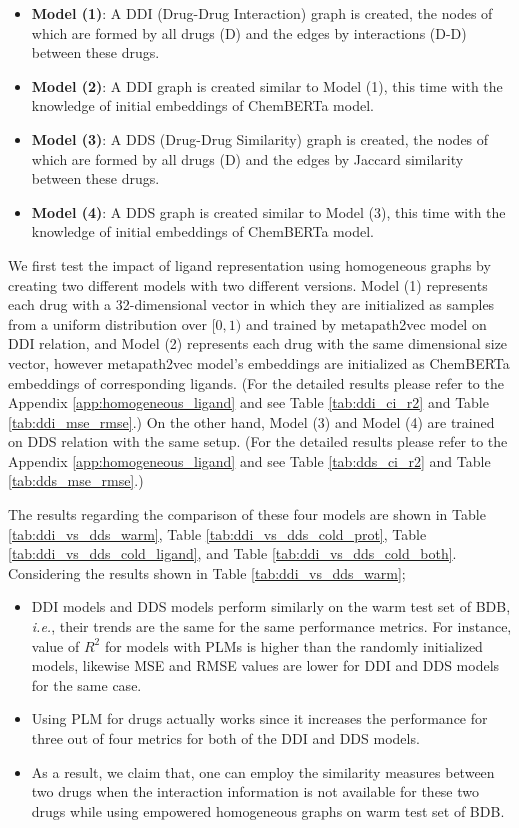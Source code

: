 \begin{itemize}
    \item \textbf{Model (1)}: A DDI (Drug-Drug Interaction) graph is created, the nodes of which are formed by all drugs (D) and the edges by interactions (D-D) between these drugs.   
    \item \textbf{Model (2)}: A DDI graph is created similar to Model (1), this time with the knowledge of initial embeddings of ChemBERTa model.
    \item \textbf{Model (3)}: A DDS (Drug-Drug Similarity) graph is created, the nodes of which are formed by all drugs (D) and the edges by Jaccard similarity between these drugs. 
    \item \textbf{Model (4)}: A DDS graph is created similar to Model (3), this time with the knowledge of initial embeddings of ChemBERTa model.
\end{itemize}

We first test the impact of ligand representation using homogeneous graphs by creating two different models with two different versions. Model (1) represents each drug with a 32-dimensional vector in which they are initialized as samples
from a uniform distribution over $[0, 1)$ and trained by metapath2vec model on DDI relation, and Model (2) represents each drug with the same dimensional size vector, however metapath2vec model's embeddings are initialized as ChemBERTa embeddings of corresponding ligands. (For the detailed results please refer to the Appendix \ref{app:homogeneous_ligand} and see Table \ref{tab:ddi_ci_r2} and Table \ref{tab:ddi_mse_rmse}.) On the other hand, Model (3) and Model (4) are trained on DDS relation with the same setup. (For the detailed results please refer to the Appendix \ref{app:homogeneous_ligand} and see Table \ref{tab:dds_ci_r2} and Table \ref{tab:dds_mse_rmse}.)

The results regarding the comparison of these four models are shown in Table \ref{tab:ddi_vs_dds_warm}, Table \ref{tab:ddi_vs_dds_cold_prot}, Table \ref{tab:ddi_vs_dds_cold_ligand}, and Table \ref{tab:ddi_vs_dds_cold_both}. Considering the results shown in Table \ref{tab:ddi_vs_dds_warm};
\begin{itemize}
    \item DDI models and DDS models perform similarly on the warm test set of BDB, \textit{i.e.}, their trends are the same for the same performance metrics. For instance, value of $R^2$ for models with PLMs is higher than the randomly initialized models, likewise MSE and RMSE values are lower for DDI and DDS models for the same case.
    \item Using PLM for drugs actually works since it increases the performance for three out of four metrics for both of the DDI and DDS models.
    \item As a result, we claim that, one can employ the similarity measures between two drugs when the interaction information is not available for these two drugs while using empowered homogeneous graphs on warm test set of BDB.
\end{itemize}


